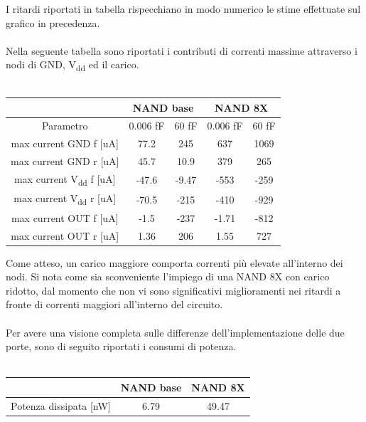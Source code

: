 \documentclass[11pt,  english, makeidx, a4paper, titlepage, oneside]{book}
\begin{document}
\vspace{0.3cm}
I ritardi riportati in tabella rispecchiano in modo numerico le stime effettuate sul grafico in precedenza.
\\\\
Nella seguente tabella sono riportati i contributi di correnti massime attraverso i nodi di GND, V\textsubscript{dd} ed il carico.
\\\\
\begin{center}
	\begin{tabular}{|c|c|c||c|c|}
	\hline
	& \multicolumn{2}{|c||}{NAND base} & \multicolumn{2}{|c|}{NAND 8X}\\
	\hline
	Parametro & 0.006 fF & 60 fF & 0.006 fF & 60 fF \\
	\hline
	max current GND f [uA] & 77.2 & 245 & 637 & 1069 \\
	\hline
	max current GND r [uA] & 45.7 & 10.9 & 379 & 265 \\
	\hline
	max current V\textsubscript{dd} f [uA] & -47.6 & -9.47 & -553 & -259 \\
	\hline
	max current V\textsubscript{dd} r [uA] & -70.5 & -215 & -410 & -929  \\
	\hline
	max current OUT f [uA] & -1.5 & -237 & -1.71 & -812 \\
	\hline
	max current OUT r [uA] & 1.36 & 206 & 1.55 & 727 \\
	\hline
	\end{tabular}	
\end{center}
\vspace{0.3cm}
Come atteso, un carico maggiore comporta correnti più elevate all'interno dei nodi. Si nota come sia sconveniente l'impiego di una NAND 8X con carico ridotto, dal momento che non vi sono significativi miglioramenti nei ritardi a fronte di correnti maggiori all'interno del circuito.
\\\\
Per avere una visione completa sulle differenze dell'implementazione delle due porte, sono di seguito riportati i consumi di potenza. 
\\\\
\begin{center}
	\begin{tabular}{|c|c|c|}
	\hline
	& NAND base & NAND 8X\\
	\hline
	Potenza dissipata [nW] & 6.79 & 49.47\\
	\hline
	\end{tabular}	
\end{center}
\end{document}
